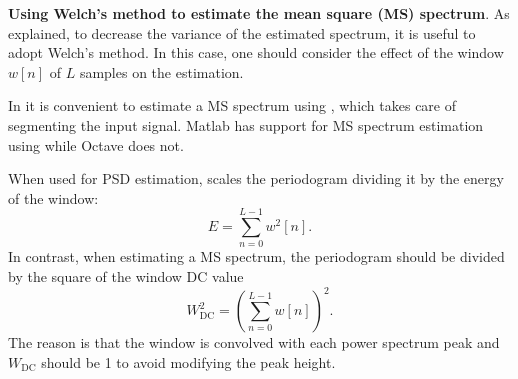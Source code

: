 %
%
%
%

\bApplication \textbf{Using Welch's method to estimate the mean square (MS) spectrum}.
As explained, to decrease the variance of the estimated spectrum, it is useful to adopt Welch's method. In this case, one should consider the effect of the window $w[n]$ of $L$ samples on the estimation. 

In {\matlab} it is convenient to estimate a MS spectrum using , which takes care of segmenting the input signal. Matlab has support for MS spectrum estimation using  while Octave does not.

When used for PSD estimation,  scales the periodogram dividing it by the energy of the window:
\[
E = \sum_{n=0}^{L-1} w^2[n].
\]
In contrast, when estimating a MS spectrum, the periodogram should be divided by the square of the window DC value
\[
W_{\textrm{DC}}^2 = \left( \sum_{n=0}^{L-1} w[n] \right)^2.
\]
The reason is that the window is convolved with each power spectrum peak and $W_{\textrm{DC}}$ should be 1 to avoid modifying the peak height. 

